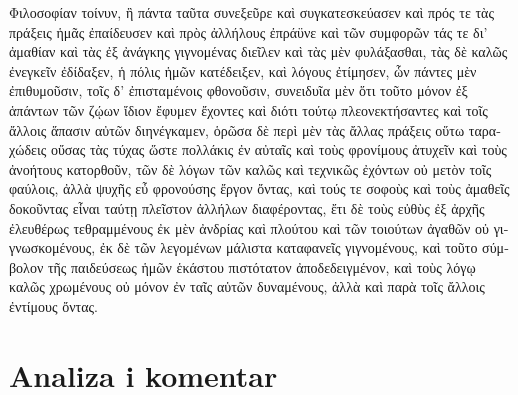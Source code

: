 \begin{greek}
{\large
{ \noindent Φιλοσοφίαν τοίνυν, ἣ πάντα ταῦτα συνεξεῦρε καὶ συγκατεσκεύασεν καὶ πρός τε τὰς πράξεις ἡμᾶς ἐπαίδευσεν καὶ πρὸς ἀλλήλους ἐπράϋνε καὶ τῶν συμφορῶν τάς τε δι' ἀμαθίαν καὶ τὰς ἐξ ἀνάγκης γιγνομένας διεῖλεν καὶ τὰς μὲν φυλάξασθαι, τὰς δὲ καλῶς ἐνεγκεῖν ἐδίδαξεν, ἡ πόλις ἡμῶν κατέδειξεν, καὶ λόγους ἐτίμησεν, ὧν πάντες μὲν ἐπιθυμοῦσιν, τοῖς δ' ἐπισταμένοις φθονοῦσιν, συνειδυῖα μὲν ὅτι τοῦτο μόνον ἐξ ἁπάντων τῶν ζῴων ἴδιον ἔφυμεν ἔχοντες καὶ διότι τούτῳ πλεονεκτήσαντες καὶ τοῖς ἄλλοις ἅπασιν αὐτῶν διηνέγκαμεν, ὁρῶσα δὲ περὶ μὲν τὰς ἄλλας πράξεις οὕτω ταραχώδεις οὔσας τὰς τύχας ὥστε πολλάκις ἐν αὐταῖς καὶ τοὺς φρονίμους ἀτυχεῖν καὶ τοὺς ἀνοήτους κατορθοῦν, τῶν δὲ λόγων τῶν καλῶς καὶ τεχνικῶς ἐχόντων οὐ μετὸν τοῖς φαύλοις, ἀλλὰ ψυχῆς εὖ φρονούσης ἔργον ὄντας, καὶ τούς τε σοφοὺς καὶ τοὺς ἀμαθεῖς δοκοῦντας εἶναι ταύτῃ πλεῖστον ἀλλήλων διαφέροντας, ἔτι δὲ τοὺς εὐθὺς ἐξ ἀρχῆς ἐλευθέρως τεθραμμένους ἐκ μὲν ἀνδρίας καὶ πλούτου καὶ τῶν τοιούτων ἀγαθῶν οὐ γιγνωσκομένους, ἐκ δὲ τῶν λεγομένων μάλιστα καταφανεῖς γιγνομένους, καὶ τοῦτο σύμβολον τῆς παιδεύσεως ἡμῶν ἑκάστου πιστότατον ἀποδεδειγμένον, καὶ τοὺς λόγῳ καλῶς χρωμένους οὐ μόνον ἐν ταῖς αὑτῶν δυναμένους, ἀλλὰ καὶ παρὰ τοῖς ἄλλοις ἐντίμους ὄντας.

}
}
\end{greek}

\vfill

\newpage

\section*{Analiza i komentar}


